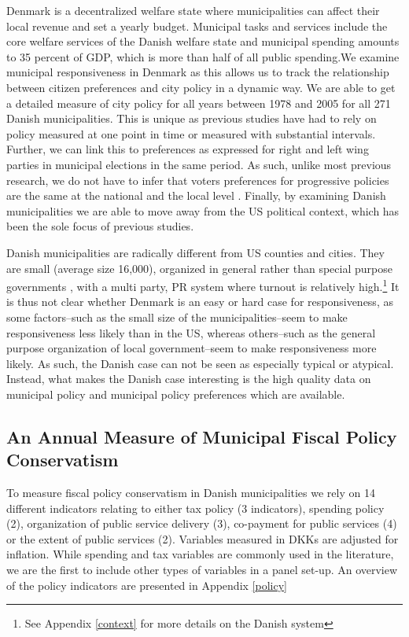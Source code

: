 \documentclass[a4paper,12pt]{article}
\begin{document}
 Denmark is a decentralized welfare state where municipalities can affect their local revenue and set a yearly budget.  Municipal tasks and services include the core welfare services of the Danish welfare state and municipal spending amounts to 35 percent of GDP, which is more than half of all public spending.We examine municipal responsiveness in Denmark as this allows us to track the relationship between citizen preferences and city policy in a dynamic way. We are able to get a detailed measure of city policy for all years between 1978 and 2005 for all 271 Danish municipalities. This is unique as previous studies have had to rely on policy measured at one point in time \citep{tausanovitch2014representation,palus2010responsiveness} or measured with substantial intervals\citep{sances2017voters,einstein2016pushing,hajnal2010or}. Further, we can link this to preferences as expressed for right and left wing parties in municipal elections in the same period. As such, unlike most previous research, we do not have to infer that voters preferences for progressive policies are the same at the national and the local level \citep[for an exception, see][]{tausanovitch2014representation}. Finally, by examining Danish municipalities we are able to move away from the US political context, which has been the sole focus of previous studies. 
 
Danish municipalities are radically different from US counties and cities. They are small (average size 16,000), organized in general rather than special purpose governments \citep{berry2009imperfect}, with a multi party, PR system where turnout is relatively high.\footnote{See Appendix \ref{context} for more details on the Danish system} It is thus not clear whether Denmark is an easy or hard case for responsiveness, as some factors--such as the small size of the municipalities--seem to make responsiveness less likely than in the US, whereas others--such as the general purpose organization of local government--seem to make responsiveness more likely. As such, the Danish case can not be seen as especially typical or atypical. Instead, what makes the Danish case interesting is the high quality data on municipal policy and municipal policy preferences which are available.


\subsection*{An Annual Measure of Municipal Fiscal Policy Conservatism}

To measure fiscal policy conservatism in Danish municipalities we rely on 14 different indicators relating to either tax policy (3 indicators), spending policy (2), organization of public service delivery (3), co-payment for public services (4) or the extent of public services (2). Variables measured in DKKs are adjusted for inflation. While  spending and tax variables are commonly used in the literature, we are the first to include other types of variables in a panel set-up. An overview of the policy indicators are presented in Appendix \ref{policy}
\end{document}
